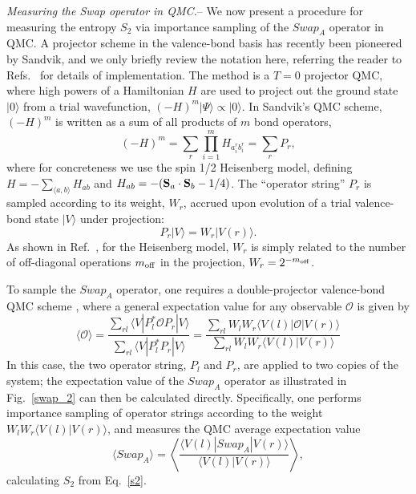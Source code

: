 \documentclass[prl,aps,twocolumn,floatfix,amsmath,amssymb,superscriptaddress,tightenlines]{revtex4}
\begin{document}
{\it Measuring the Swap operator in QMC.}--
We now present a procedure for measuring the entropy $S_2$ via importance sampling of the $Swap_A$ operator in QMC.  A
projector scheme in the valence-bond basis has recently been pioneered by Sandvik, and we only briefly
review the notation here, referring the reader to Refs.~\cite{Sandvik,Beach,AWSloop} for details of implementation.
The method is a $T=0$ projector QMC, where high powers of
a Hamiltonian $H$ are used to project out the ground state $|0\rangle$ from a trial wavefunction, 
$(-H)^m|\Psi \rangle \propto |0\rangle$.  In Sandvik's QMC scheme, $(-H)^m$ is written as a sum of all products of $m$ bond
operators,
\begin{equation}
(-H)^m = \sum_r \prod_{i=1}^m H_{a_i^r b_i^r} = \sum_r P_r,
\end{equation}
where for concreteness we use the spin 1/2 Heisenberg model, defining $H=-\sum_{\langle a,b \rangle}H_{ab}$ and 
$H_{ab} = -({\bf S}_a \cdot {\bf S}_b - 1/4)$.  The ``operator string'' $P_r$ is sampled according to its weight, $W_r$, accrued upon
evolution of a trial valence-bond state $|V \rangle$ under projection:
\begin{equation}
P_r |V \rangle = W_r |V(r) \rangle.
\end{equation} 
As shown in Ref.~\cite{Sandvik}, for the Heisenberg model, $W_r$ is simply related to the number of off-diagonal 
operations $m_{\rm off}$ in the projection, $W_r = 2^{-m_{\rm off}}$.

To sample the $Swap_A$ operator, one requires a double-projector valence-bond QMC scheme \cite{Sandvik}, where
a general expectation value for any observable $\mathcal{O}$ is given by
\begin{equation}
\label{expect}
\langle \mathcal{O} \rangle = \frac{\sum_{rl} \langle V | P_l^* \mathcal{O} P_r | V \rangle} {\sum_{rl} \langle V | P_l^* P_r | V \rangle} 
= \frac{\sum_{rl} W_l W_r \langle V(l) | \mathcal{O} | V(r) \rangle} {\sum_{rl} W_l W_r \langle V(l) | V(r) \rangle}
\end{equation} 
In this case, the two operator string, $P_l$ and $P_r$, are applied to two copies of the system; 
the expectation value of the $Swap_A$ operator as illustrated in Fig.~\ref{swap_2} 
can then be calculated directly.  Specifically, one 
performs importance sampling of operator strings according to the weight $W_l W_r \langle V(l) | V(r) \rangle$, and measures
the QMC average expectation value
\begin{equation}
\langle Swap_A \rangle =  \left\langle{ \frac{ \langle V(l) | Swap_A | V(r) \rangle}{\langle V(l) | V(r) \rangle}  }\right\rangle,
\label{Swap}
\end{equation}
calculating $S_2$ from Eq.~\eqref{s2}.
\end{document}
